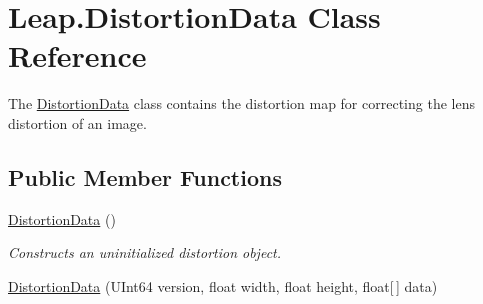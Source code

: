 \hypertarget{class_leap_1_1_distortion_data}{}\section{Leap.\+Distortion\+Data Class Reference}
\label{class_leap_1_1_distortion_data}


The \mbox{\hyperlink{class_leap_1_1_distortion_data}{Distortion\+Data}} class contains the distortion map for correcting the lens distortion of an image.  


\subsection*{Public Member Functions}
\begin{DoxyCompactItemize}
\item 
\mbox{\hyperlink{class_leap_1_1_distortion_data_a866479e2791b3ff9b3a883a5033afbc2}{Distortion\+Data}} ()
\begin{DoxyCompactList}\small\item\em Constructs an uninitialized distortion object. \end{DoxyCompactList}\item 
\mbox{\hyperlink{class_leap_1_1_distortion_data_a7c0d09d78242062014752f7d1ac8823a}{Distortion\+Data}} (U\+Int64 version, float width, float height, float\mbox{[}$\,$\mbox{]} data)
\end{DoxyCompactItemize}
